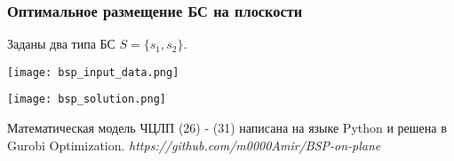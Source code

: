\begin{frame}
    \frametitle{Оптимальное размещение БС на плоскости}
    \fontsize{10pt}{7.2}\selectfont
    \justifying
    
    Заданы два типа БС $S = \{s_1, s_2\}$.

    \begin{minipage}[c]{0.45\linewidth}
        \fontsize{8pt}{7.2}\selectfont
        \bigskip
        \texttt{[image: bsp\_input\_data.png]}
        
    \end{minipage}  
    \begin{minipage}[c]{0.45\linewidth}
        \texttt{[image: bsp\_solution.png]}

    \end{minipage}

    \medskip Математическая модель ЧЦЛП (26) - (31) написана на языке Python и решена в Gurobi Optimization.
    \textit{https://github.com/m0000Amir/BSP-on-plane}
    
\end{frame}

